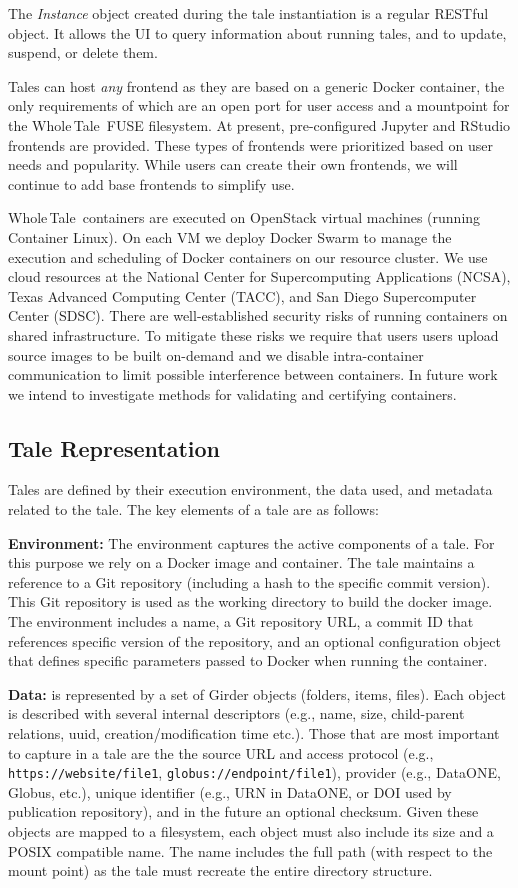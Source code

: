 \documentclass{elsarticle}
\newcommand{\wt}{Whole\,Tale}
\begin{document}
The \emph{Instance} object created during the tale instantiation is a regular RESTful object. It allows the UI to query information about running tales, and to update, suspend, or delete them. 

Tales can host \emph{any} frontend as they are based on a generic
Docker container, the only requirements of which are an open port
for user access and a mountpoint for the \wt\ FUSE filesystem. 
At present, pre-configured Jupyter and RStudio frontends are provided. These types of frontends were prioritized based on user needs and popularity.  
While users can create their own frontends, we will continue to add base
frontends to simplify use. 

\wt\ containers are executed on OpenStack virtual machines
(running Container Linux). On each VM we deploy Docker Swarm 
to manage the execution and scheduling of Docker containers
on our resource cluster. We use cloud resources at 
the National Center for Supercomputing Applications (NCSA), 
Texas Advanced Computing Center (TACC), and San Diego Supercomputer
Center (SDSC). 
There are well-established security risks of running containers
on shared infrastructure. To mitigate these risks we require that
users users upload source images to be built on-demand and
we disable intra-container communication to limit possible interference
between containers. In future work we intend to investigate 
methods for validating and certifying containers.

\subsection{Tale Representation}
Tales are defined by their execution environment, the data used, and metadata related to the tale. 
The key elements of a tale are as follows:

\textbf{Environment:} The environment captures the active components of a tale. For this purpose we rely on a Docker image and container. The tale 
maintains a reference to a Git repository (including a hash to the specific commit version). This Git repository is used as the working directory to build the docker image. 
The environment includes a name, a Git repository URL, a commit ID that references specific version of the repository, and an optional configuration object that defines specific parameters passed to Docker when running the container. 

\textbf{Data:} is represented by a set of Girder objects (folders, items, files). Each object is described with several internal descriptors (e.g., name, size, child-parent relations, uuid, creation/modification time etc.). Those that are most important to capture in a tale are the the source URL and access protocol (e.g.,  \texttt{https://website/file1}, \texttt{globus://endpoint/file1}), provider (e.g., DataONE, Globus, etc.), unique identifier (e.g., URN in DataONE, or DOI used by publication repository), and in the future an optional checksum. Given these objects are mapped to a filesystem, each object must also include its size and a POSIX compatible name. The name includes the full path (with respect to the mount point) as the tale must recreate the entire directory structure. 
\end{document}
